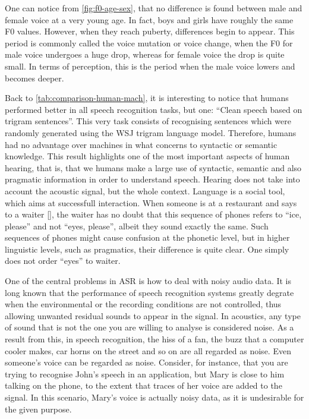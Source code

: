 One can notice from \autoref{fig:f0-age-sex}, that no difference is found between male and female voice at a very young age. 
In fact, boys and girls have roughly the same \ac{F0} values. However, when they reach puberty, differences begin to appear. 
This period is commonly called the voice mutation or voice change, when the \ac{F0} for male voice undergoes a huge drop, whereas 
for female voice the drop is quite small. In terms of perception, this is the period when the male voice lowers and becomes deeper.

Back to \autoref{tab:comparison-human-mach}, it is interesting to notice that humans
performed better in all speech recognition tasks, but one: ``Clean speech based on trigram sentences''.
This very task consists of recognising sentences which were randomly generated using the WSJ trigram language model. 
Therefore, humans had no advantage over machines in what concerns to syntactic or semantic knowledge. 
This result highlights one of the most important aspects of human hearing, that is, that we humans make a large use of syntactic, 
semantic and also pragmatic information in order to understand speech. Hearing does not take into account 
the acoustic signal, but the whole context. Language is a social tool, which aims at successfull interaction. When someone is at a restaurant and says to a waiter
[], the waiter has no doubt that this sequence of phones refers to ``ice, please'' and not ``eyes, please'', albeit they sound exactly the same. Such sequences of phones might cause confusion at the phonetic level, but
in higher linguistic levels, such as pragmatics, their difference is quite clear. One simply does not order ``eyes'' to waiter.

One of the central problems in \ac{ASR} is how to deal with noisy audio data. It is long known that the performance of 
speech recognition systems greatly degrate when the environmental or the recording conditions are not controlled, 
thus allowing unwanted residual sounds to appear in the signal. In acoustics, any type of sound that is not the one
you are willing to analyse is considered noise. As a result from this, in speech recognition, the hiss of a fan, 
the buzz that a computer cooler makes, car horns on the street and so on are all regarded as noise. Even someone's voice
can be regarded as noise. Consider, for instance, that you are trying to recognise John's speech in an application, 
but Mary is close to him talking on the phone, to the extent that traces of her voice are added to the signal. In this
scenario, Mary's voice is actually noisy data, as it is undesirable for the given purpose. 

